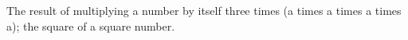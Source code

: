  The result of multiplying a number by itself three times (a times a times a times a);
the square of a square number.
